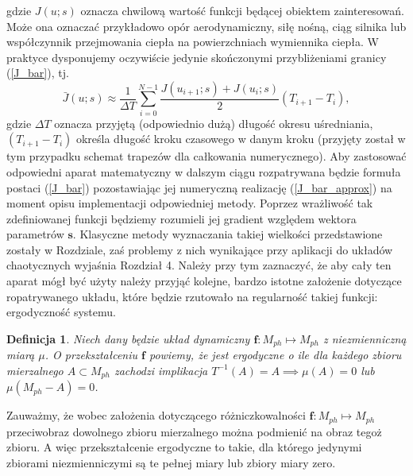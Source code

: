 \documentclass[12pt, twoside]{book}
\newtheorem{defi}{Definicja}
\begin{document}
gdzie $ J(u;s) $ oznacza chwilową wartość funkcji będącej obiektem zainteresowań. Może ona oznaczać przykładowo opór aerodynamiczny, siłę nośną, ciąg silnika lub współczynnik przejmowania ciepła na powierzchniach wymiennika ciepła. W praktyce dysponujemy oczywiście jedynie skończonymi przybliżeniami granicy (\ref{J_bar}), tj.
\begin{equation}
\bar{J}(u;s) \approx \frac{1}{\Delta T}\sum_{i=0}^{N-1}\frac{J(u_{i+1};s)+J(u_{i};s)}{2}(T_{i+1}-T_{i}),
\label{J_bar_approx}
\end{equation}
gdzie $ \Delta T $ oznacza przyjętą (odpowiednio dużą) długość okresu uśredniania,  $ (T_{i+1}-T_{i}) $ określa długość kroku czasowego w danym kroku (przyjęty został w tym przypadku schemat trapezów dla całkowania numerycznego).\newline
Aby zastosować odpowiedni aparat matematyczny w dalszym ciągu rozpatrywana będzie formuła postaci (\ref{J_bar}) pozostawiając jej numeryczną realizację (\ref{J_bar_approx}) na moment opisu implementacji odpowiedniej metody. Poprzez wrażliwość tak zdefiniowanej funkcji będziemy rozumieli jej gradient względem wektora parametrów $ \textbf{s} $. Klasyczne metody wyznaczania takiej wielkości przedstawione zostały w Rozdziale, zaś problemy z nich wynikające przy aplikacji do układów chaotycznych wyjaśnia Rozdział 4. Należy przy tym zaznaczyć, że aby cały ten aparat mógł być użyty należy przyjąć kolejne, bardzo istotne założenie dotyczące ropatrywanego układu, które będzie rzutowało na regularność takiej funkcji: ergodyczność systemu.
\begin{defi}\label{ergodicity}
Niech dany będzie układ dynamiczny $  \textbf{f}: M_{ph} \mapsto M_{ph}$ z niezmienniczną miarą $\mu$. O przekształceniu $  \textbf{f}$ powiemy, że jest ergodyczne o ile dla każdego zbioru mierzalnego $ A \subset M_{ph} $ zachodzi implikacja 
$ T^{-1}(A) = A  \implies \mu(A)=0$ lub $\mu(M_{ph}-A)=0$.
\end{defi} 
Zauważmy, że wobec założenia dotyczącego różniczkowalności $  \textbf{f}: M_{ph} \mapsto M_{ph}$ przeciwobraz dowolnego zbioru mierzalnego można podmienić na obraz tegoż zbioru. A więc przekształcenie ergodyczne to takie, dla którego jedynymi zbiorami niezmienniczymi są te pełnej miary lub zbiory miary zero. \newline
\end{document}
